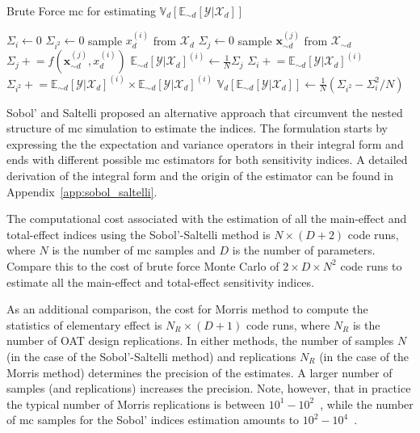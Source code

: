 \begin{algorithm}
\caption{Brute Force \gls{mc} for estimating $\mathbb{V}_d [\mathbb{E}_{\sim d} [\mathcal{Y}|\mathcal{X}_d]]$}
\label{alg:brute_force_mc}
\begin{algorithmic}
\STATE $\Sigma_i \leftarrow 0$
\STATE $\Sigma_{i^2} \leftarrow 0$
    \STATE sample $x_d^{(i)}$ from $\mathcal{X}_d$
    \STATE $\Sigma_j \leftarrow 0$
      \STATE sample $\bm{x}_{\sim d}^{(j)}$ from $\bm{\mathcal{X}}_{\sim d}$
      \STATE $\Sigma_j \mathrel{+}= f(\bm{x}_{\sim d}^{(j)}, x_d^{(i)})$ 
    \ENDFOR
    \STATE $\mathbb{E}_{\sim d} [\mathcal{Y}|\mathcal{X}_d]^{(i)} \leftarrow \frac{1}{N} \Sigma_j$
    \STATE $\Sigma_i \mathrel{+}= \mathbb{E}_{\sim d} [\mathcal{Y}|\mathcal{X}_d]^{(i)}$
    \STATE $\Sigma_{i^2} \mathrel{+}= \mathbb{E}_{\sim d} [\mathcal{Y}|\mathcal{X}_d]^{(i)} \times \mathbb{E}_{\sim d} [\mathcal{Y}|\mathcal{X}_d]^{(i)}$
  \ENDFOR
  \STATE $\mathbb{V}_d [\mathbb{E}_{\sim d} [\mathcal{Y}|\mathcal{X}_d]] \leftarrow \frac{1}{N} \left(\Sigma_{i^2} - \Sigma_i^2/N\right)$
\end{algorithmic}
\end{algorithm}

Sobol' \cite{Sobol2001} and Saltelli \cite{Saltelli2002} proposed an alternative approach that circumvent the nested structure of \gls{mc} simulation to estimate the indices.
The formulation starts by expressing the the expectation and variance operators in their integral form 
and ends with different possible \gls{mc} estimators for both sensitivity indices.
A detailed derivation of the integral form and the origin of the estimator can be found in Appendix~\ref{app:sobol_saltelli}. 

The computational cost associated with the estimation of all the main-effect and total-effect indices using the Sobol'-Saltelli method is $N \times (D + 2)$ code runs,
where $N$ is the number of \gls{mc} samples and $D$ is the number of parameters.
Compare this to the cost of brute force Monte Carlo of $2 \times D \times N^2$ code runs to estimate all the main-effect and total-effect sensitivity indices. 

As an additional comparison, the cost for Morris method to compute the statistics of elementary effect is $N_R \times (D + 1)$ code runs,
where $N_R$ is the number of OAT design replications.
In either methods, the number of samples $N$ (in the case of the Sobol'-Saltelli method) and replications $N_R$ (in the case of the Morris method)
determines the precision of the estimates.
A larger number of samples (and replications) increases the precision.
Note, however, that in practice the typical number of Morris replications is between $10^1 - 10^2$~\cite{Saltelli2010}, 
while the number of \gls{mc} samples for the Sobol' indices estimation amounts to $10^2 - 10^4$~\cite{Sobol2001}.

